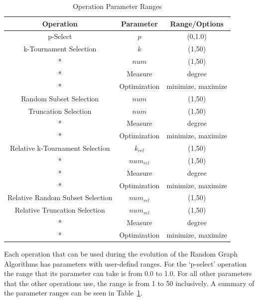 \documentclass{article}
\begin{document}
\begin{table}
    \begin{center}
    

    \begin{tabular}{|c|c|c|}
        \hline
        \textbf{Operation} &\textbf{Parameter}&\textbf{Range/Options}\\ \hline
        p-Select & $p$ & (0,1.0)\\ \hline \hline
        k-Tournament Selection & $k$ & (1,50) \\ \hline
        * & $num$ & (1,50)\\ \hline
        * & Measure & degree \\ \hline
        * & Optimization & minimize, maximize \\ \hline \hline
        Random Subset Selection & $num$ & (1,50) \\ \hline \hline
        Truncation Selection & $num$ & (1,50) \\ \hline
        * & Measure & degree \\ \hline
        * & Optimization & minimize, maximize \\ \hline \hline

        Relative k-Tournament Selection & $k_{rel}$ & (1,50) \\ \hline
        * & $num_{rel}$ & (1,50)\\ \hline
        * & Measure & degree \\ \hline
        * & Optimization & minimize, maximize \\ \hline \hline
        Relative Random Subset Selection & $num_{rel}$ & (1,50) \\ \hline \hline
        Relative Truncation Selection & $num_{rel}$ & (1,50) \\ \hline
        * & Measure & degree \\ \hline
        * & Optimization & minimize, maximize \\ \hline

    \end{tabular}
    \end{center}
\caption{Operation Parameter Ranges}
    \label{tab:op}
\end{table}

Each operation that can be used during the evolution of the Random Graph Algorithms has parameters with user-defind ranges. For the `p-select' operation
the range that its parameter can take is from 0.0 to 1.0. For all other parameters that the other operations use, the range is from 1 to 50 inclusively.
A summary of the parameter ranges can be seen in Table~\ref{tab:op}.
\end{document}

